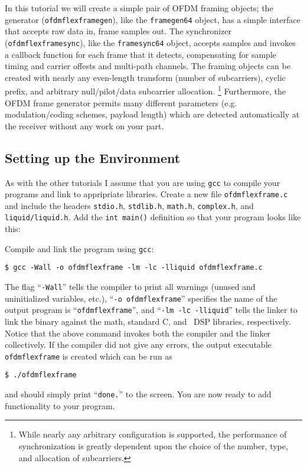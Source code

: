 In this tutorial we will create a simple pair of OFDM framing objects;
the generator ({\tt ofdmflexframegen}),
like the {\tt framegen64} object,
has a simple interface that accepts raw data in, frame samples out.
The synchronizer ({\tt ofdmflexframesync}),
like the {\tt framesync64} object,
accepts samples and invokes a callback function for each frame that it
detects,
compensating for sample timing and carrier offests and multi-path
channels.
The framing objects can be created with nearly any even-length transform
(number of subcarriers),
cyclic prefix, and arbitrary null/pilot/data subcarrier allocation.%
\footnote{While nearly any arbitrary configuration is supported, the
          performance of synchronization is greatly dependent upon the
          choice of the number, type, and allocation of subcarriers.
          }
Furthermore, the OFDM frame generator permits many different parameters
(e.g. modulation/coding schemes, payload length)
which are detected automatically at the receiver without any work on
your part.


%
%
\subsection{Setting up the Environment}
\label{tutorial:ofdmflexframe:environment}

As with the other tutorials I assume that you are using {\tt gcc} to
compile your programs and link to appripriate libraries.
Create a new file {\tt ofdmflexframe.c} and include the headers
{\tt stdio.h},
{\tt stdlib.h},
{\tt math.h},
{\tt complex.h}, and
{\tt liquid/liquid.h}.
Add the {\tt int main()} definition so that your program looks like
this:
%

%
Compile and link the program using {\tt gcc}:
%
\begin{Verbatim}[fontsize=\small]
    $ gcc -Wall -o ofdmflexframe -lm -lc -lliquid ofdmflexframe.c
\end{Verbatim}
%
The flag ``{\tt -Wall}'' tells the compiler to print all warnings
(unused and uninitialized variables, etc.),
``{\tt -o ofdmflexframe}'' specifies the name of the output program is
``{\tt ofdmflexframe}'', and
``{\tt -lm -lc -lliquid}'' tells the linker to link the binary against
the math, standard C, and \liquid\ DSP libraries, respectively.
Notice that the above command invokes both the compiler and the linker
collectively.
%
If the compiler did not give any errors, the output executable
{\tt ofdmflexframe} is created which can be run as
%
\begin{Verbatim}[fontsize=\small]
    $ ./ofdmflexframe
\end{Verbatim}
%
and should simply print ``{\tt done.}'' to the screen.
You are now ready to add functionality to your program.



